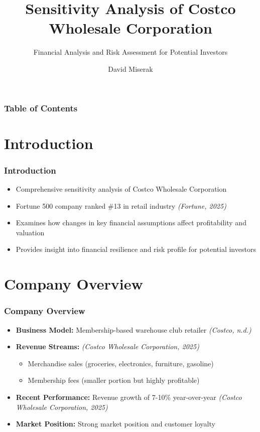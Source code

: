 \documentclass[11pt]{beamer}
\author{David Miserak}
\title{Sensitivity Analysis of Costco Wholesale Corporation}
\subtitle{Financial Analysis and Risk Assessment for Potential Investors}
\date{}
\institute{Business 5030}
\begin{document}
\begin{frame}
\titlepage
\end{frame}

\begin{frame}
\frametitle{Table of Contents}
\tableofcontents
\end{frame}

\section{Introduction}
\begin{frame}
\frametitle{Introduction}
\begin{itemize}
  \item Comprehensive sensitivity analysis of Costco Wholesale Corporation
  \item Fortune 500 company ranked \#13 in retail industry \textit{(Fortune, 2025)}
  \item Examines how changes in key financial assumptions affect profitability and valuation
  \item Provides insight into financial resilience and risk profile for potential investors
\end{itemize}
\end{frame}

\section{Company Overview}
\begin{frame}
\frametitle{Company Overview}
\begin{itemize}
  \item \textbf{Business Model:} Membership-based warehouse club retailer \textit{(Costco, n.d.)}
  \item \textbf{Revenue Streams:} \textit{(Costco Wholesale Corporation, 2025)}
    \begin{itemize}
      \item Merchandise sales (groceries, electronics, furniture, gasoline)
      \item Membership fees (smaller portion but highly profitable)
    \end{itemize}
  \item \textbf{Recent Performance:} Revenue growth of 7-10\% year-over-year \textit{(Costco Wholesale Corporation, 2025)}
  \item \textbf{Market Position:} Strong market position and customer loyalty
\end{itemize}
\end{frame}
\end{document}

